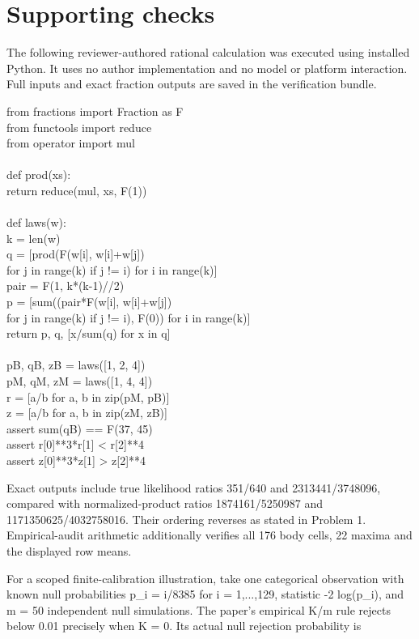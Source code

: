 \documentclass[10pt]{article}
\begin{document}
\section*{Supporting checks}
The following reviewer-authored rational calculation was executed using installed Python. It uses no author implementation and no model or platform interaction. Full inputs and exact fraction outputs are saved in the verification bundle.\par
{\ttfamily\footnotesize from fractions import Fraction as F\\
from functools import reduce\\
from operator import mul\\
\\
def prod(xs):\\
    return reduce(mul, xs, F(1))\\
\\
def laws(w):\\
    k = len(w)\\
    q = [prod(F(w[i], w[i]+w[j])\\
              for j in range(k) if j != i) for i in range(k)]\\
    pair = F(1, k*(k-1)//2)\\
    p = [sum((pair*F(w[i], w[i]+w[j])\\
              for j in range(k) if j != i), F(0)) for i in range(k)]\\
    return p, q, [x/sum(q) for x in q]\\
\\
pB, qB, zB = laws([1, 2, 4])\\
pM, qM, zM = laws([1, 4, 4])\\
r = [a/b for a, b in zip(pM, pB)]\\
z = [a/b for a, b in zip(zM, zB)]\\
assert sum(qB) == F(37, 45)\\
assert r[0]**3*r[1] < r[2]**4\\
assert z[0]**3*z[1] > z[2]**4}\par
Exact outputs include true likelihood ratios 351/640 and 2313441/3748096, compared with normalized-product ratios 1874161/5250987 and 1171350625/4032758016. Their ordering reverses as stated in Problem 1. Empirical-audit arithmetic additionally verifies all 176 body cells, 22 maxima and the displayed row means.\par
For a scoped finite-calibration illustration, take one categorical observation with known null probabilities p\_i = i/8385 for i = 1,...,129, statistic -2 log(p\_i), and m = 50 independent null simulations. The paper’s empirical K/m rule rejects below 0.01 precisely when K = 0. Its actual null rejection probability is\par
\end{document}
